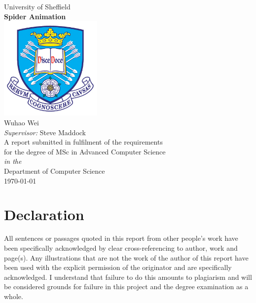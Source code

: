 \documentclass[11pt,oneside]{book}
\begin{document}
\frontmatter

\begin{titlepage}


\begin{center}
{\LARGE University of Sheffield}\\[1.5cm]
\linespread{1.2}\huge {\bfseries Spider Animation}\\[1.5cm]
\linespread{1}
\includegraphics[width=5cm]{images/tuoslogo.png}\\[1cm]
{\Large Wuhao Wei}\\[1cm]
{\large \emph{Supervisor:} Steve Maddock}\\[1cm]
\large A report submitted in fulfilment of the requirements\\ for the degree of MSc in Advanced Computer Science\\[0.3cm] 
\textit{in the}\\[0.3cm]
Department of Computer Science\\[2cm]
\today
\end{center}

\end{titlepage}


\newpage
\chapter*{\Large Declaration}


All sentences or passages quoted in this report from other people's work have been specifically acknowledged by clear cross-referencing to author, work and page(s). Any illustrations that are not the work of the author of this report have been used with the explicit permission of the originator and are specifically acknowledged. I understand that failure to do this amounts to plagiarism and will be considered grounds for failure in this project and the degree examination as a whole.
 
\end{document}
